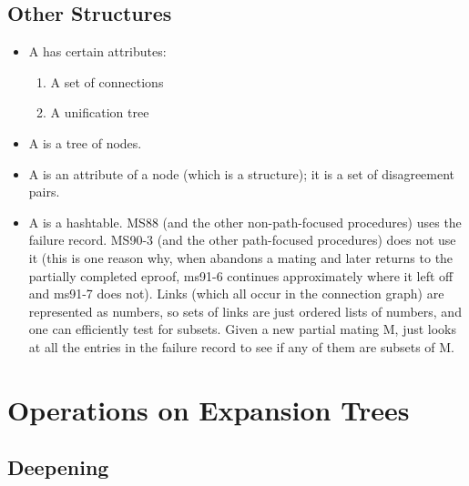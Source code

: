 \subsection{Other Structures}
\begin{itemize}
\item A  has certain attributes:
\begin{enumerate}
\item A set of connections

\item A unification tree
\end{enumerate}

\item A  is a tree of nodes.

\item A  is an attribute of a node (which is a structure); it is 
a set of disagreement pairs.

\item A  is a hashtable. 
MS88 (and the other non-path-focused procedures) uses the failure 
record.  MS90-3 (and the other path-focused procedures) does not use it (this is one reason
why, when \TPS abandons a mating and later returns to the partially completed 
eproof, ms91-6 continues approximately where it left off and ms91-7 does not).
Links (which all occur in the connection graph) are represented as numbers,
so sets of links are just ordered lists of numbers, and one can
efficiently test for subsets. 
Given a new partial mating M, \TPS just
looks at all the entries in the failure record to see if any of them
are subsets of M. 

\end{itemize}

\section{Operations on Expansion Trees}

\subsection{Deepening}\label{deepening}

